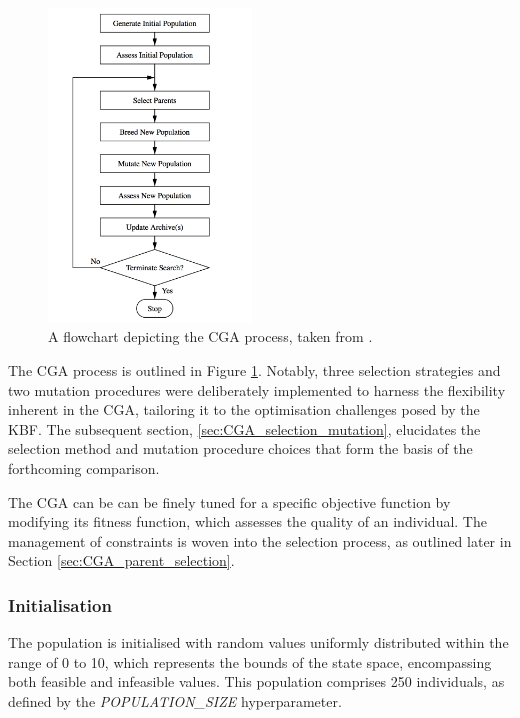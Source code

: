 \documentclass[10pt]{article}
\begin{document}
\begin{multicols}{2}
\begin{figure}[H]
    \centering
    \includegraphics[width=0.48\textwidth]{../figures/Permanent Images/Flowchart.png}
    \captionsetup{justification=centering}
    \caption{A flowchart depicting the CGA process, taken from \cite{parks2023geneticalgorithms}.}
    \label{fig:GAprocess}
\end{figure}

The CGA process is outlined in Figure \ref{fig:GAprocess}. Notably, three selection strategies and two mutation procedures were deliberately implemented to harness the flexibility inherent in the CGA, tailoring it to the optimisation challenges posed by the KBF. The subsequent section, \ref{sec:CGA_selection_mutation}, elucidates the selection method and mutation procedure choices that form the basis of the forthcoming comparison.

The CGA can be can be finely tuned for a specific objective function by modifying its fitness function, which assesses the quality of an individual. The management of constraints is woven into the selection process, as outlined later in Section \ref{sec:CGA_parent_selection}.

\subsubsection{Initialisation}

The population is initialised with random values uniformly distributed within the range of 0 to 10, which represents the bounds of the state space, encompassing both feasible and infeasible values. This population comprises 250 individuals, as defined by the \textit{POPULATION\_SIZE} hyperparameter. 


\end{multicols}
\end{document}
